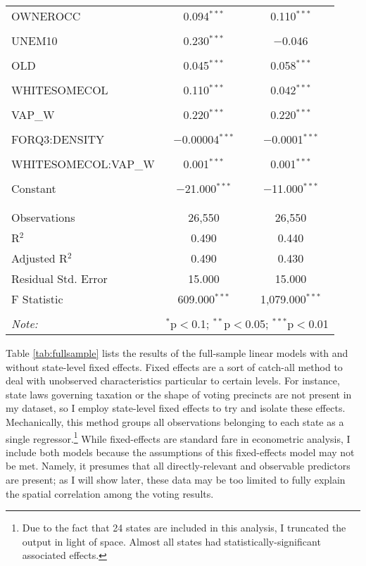 \documentclass[
]{article}
\begin{document}
\begin{table}[!htbp]
\begin{tabular}{@{\extracolsep{3pt}}lcc}
 OWNEROCC & 0.094$^{***}$ & 0.110$^{***}$ \\
  & & \\
 UNEM10 & 0.230$^{***}$ & $-$0.046 \\
  & & \\
 OLD & 0.045$^{***}$ & 0.058$^{***}$ \\
  & & \\
 WHITESOMECOL & 0.110$^{***}$ & 0.042$^{***}$ \\
  & & \\
 VAP\_W & 0.220$^{***}$ & 0.220$^{***}$ \\
  & & \\
 FORQ3:DENSITY & $-$0.00004$^{***}$ & $-$0.0001$^{***}$ \\
  & & \\
 WHITESOMECOL:VAP\_W & 0.001$^{***}$ & 0.001$^{***}$ \\
  & & \\
 Constant & $-$21.000$^{***}$ & $-$11.000$^{***}$ \\
  & & \\
\hline \\[-1.8ex]
Observations & 26,550 & 26,550 \\
R$^{2}$ & 0.490 & 0.440 \\
Adjusted R$^{2}$ & 0.490 & 0.430 \\
Residual Std. Error & 15.000 & 15.000 \\
F Statistic & 609.000$^{***}$ & 1,079.000$^{***}$ \\
\hline
\hline \\[-1.8ex]
\textit{Note:}  & \multicolumn{2}{r}{$^{*}$p$<$0.1; $^{**}$p$<$0.05; $^{***}$p$<$0.01} \\
\end{tabular}
\end{table}

Table \ref{tab:fullsample} lists the results of the full-sample linear models with and without state-level fixed effects.
Fixed effects are a sort of catch-all method to deal with unobserved characteristics particular to certain levels.
For instance, state laws governing taxation or the shape of voting precincts are not present in my dataset, so I employ state-level fixed effects to try and isolate these effects.
Mechanically, this method groups all observations belonging to each state as a single regressor.\footnote{Due to the fact that 24 states are included in this analysis, I truncated the output in light of space. Almost all states had statistically-significant associated effects.}
While fixed-effects are standard fare in econometric analysis, I include both models because the assumptions of this fixed-effects model may not be met.
Namely, it presumes that all directly-relevant and observable predictors are present; as I will show later, these data may be too limited to fully explain the spatial correlation among the voting results.
\end{document}
